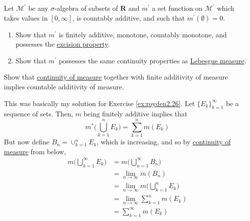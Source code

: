   \begin{exercise}[Royden 2.27]
    Let $\mathcal{M}^{\prime}$ be any $\sigma$-algebra of subsets of $\mathbf{R}$ and $m^{\prime}$ a set function on $\mathcal{M}^{\prime}$ which takes values in $[0, \infty]$, is countably additive, and such that $m^{\prime}(\emptyset) = 0$.
    \begin{enumerate}
      \item Show that $m^{\prime}$ is finitely additive, monotone, countably monotone, and possesses the \hyperref[thm:excision-property]{excision property}.
      \item Show that $m^{\prime}$ possesses the same continuity properties as \hyperref[def:lebesgue-measure]{Lebesgue measure}.
    \end{enumerate}
  \end{exercise}

  \begin{exercise}[Royden 2.28]
    Show that \hyperref[thm:continuity-of-measure]{continuity of measure} together with finite additivity of measure implies countable additivity of measure.
  \end{exercise}
  \begin{solution}
    This was basically my solution for Exercise \ref{ex:royden2.26}. Let $\{E_k\}_{k=1}^\infty$ be a sequence of sets. Then, $m$ being finitely additive implies that 
    \begin{equation}
      m^\ast \bigg( \bigcup_{k=1}^n E_k \bigg) = \sum_{k=1}^n m(E_k) 
    \end{equation}
    But now define $B_n = \cup_{k=1}^n E_k$, which is increasing, and so by \hyperref[thm:continuity-of-measure]{continuity of measure} from below, 
    \begin{align}
      m \bigg( \bigcup_{k=1}^\infty E_k \bigg) & = m \bigg( \bigcup_{n=1}^\infty B_n \bigg) \\ 
                                               & = \lim_{n \to \infty} m(B_n) \\ 
                                               & = \lim_{n \to \infty} m \bigg( \bigcup_{k=1}^n E_k \bigg) \\ 
                                               & = \lim_{n \to \infty} \sum_{k=1}^n m(E_k) \\ 
                                               & = \sum_{k=1}^\infty m(E_k)
    \end{align}
  \end{solution}

